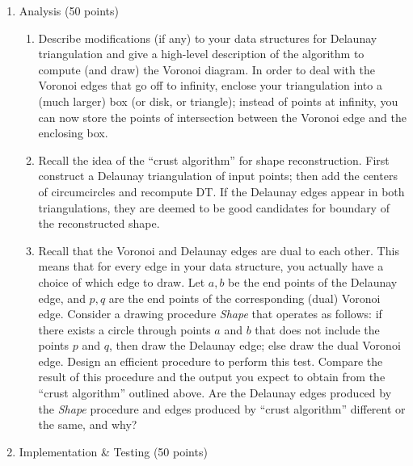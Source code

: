 \documentclass[11pt]{article}
\begin{document}
\begin{enumerate}

\item Analysis (50 points)
\begin{enumerate}

\item
Describe modifications (if any) to your data structures for Delaunay
triangulation and give a high-level description of the algorithm to
compute  (and draw)  the Voronoi diagram.   In order to deal with   the Voronoi edges 
that go off to infinity, enclose your triangulation into a (much larger) box (or disk, 
or triangle);  instead of points at infinity,  you can now store the points of
intersection between the Voronoi edge and the enclosing box.  


\item 
Recall the idea of the ``crust algorithm'' for shape reconstruction. 
First construct a Delaunay triangulation of input points;  then 
add the centers of circumcircles and recompute DT.  If the Delaunay edges 
appear in both triangulations, they are deemed to be good candidates
for boundary of the reconstructed shape.

\item
Recall that the Voronoi and Delaunay edges are dual to each other.  This means 
that for every edge in your data structure,  you actually have a choice of 
which edge to draw.   Let $a,b$ be the end points of the Delaunay edge, and 
$p, q$ are the end points of the corresponding (dual) Voronoi edge.  
Consider a drawing   procedure \emph{Shape} that  operates as follows:   if there 
exists a circle through points $a$ and $b$ that does not include the points $p$ 
and $q$,  then draw the Delaunay edge;  else draw the dual Voronoi edge.  Design an 
efficient procedure to perform this test. Compare  the result of this 
procedure and the output you expect to obtain from the ``crust algorithm''
outlined above. Are the Delaunay edges produced by the \emph{Shape} procedure and edges
produced by ``crust algorithm'' different or the same, and why?




\end{enumerate}

\item Implementation \& Testing (50 points)


\end{enumerate}
\end{document}
